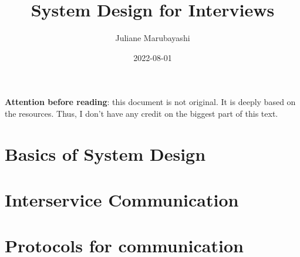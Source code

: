 \documentclass{article}
\title{System Design for Interviews}
\author{Juliane Marubayashi}
\date{ 2022-08-01 }
\begin{document}
    \maketitle
    \newpage
    \tableofcontents
    \newpage
    \textbf{Attention before reading}: this document is not original. It is deeply based on the resources.
    Thus, I don't have any credit on the biggest part of this text. 
    \section{Basics of System Design}
    
    \section{Interservice Communication}
    
    \section{Protocols for communication}
    
    
    
\end{document}
